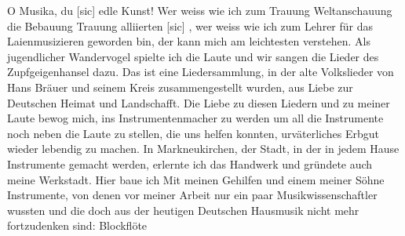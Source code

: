 \def\day{5.9.42}
\mktitle

O Musika, du{\color{red} [sic] } edle Kunst!
Wer weiss wie ich zum  Trauung  Weltanschauung  die Bebauung Trauung  alliierten {\color{red} [sic] }, wer weiss wie ich zum Lehrer f\"{u}r das Laienmusizieren geworden bin, der kann mich am leichtesten verstehen.
Als jugendlicher Wandervogel spielte ich die Laute und wir sangen die Lieder des Zupfgeigenhansel dazu.
Das ist eine Liedersammlung, in der alte Volkslieder von Hans Br\"{a}uer und seinem Kreis zusammengestellt wurden, aus Liebe zur Deutschen Heimat und Landschafft.
Die Liebe zu diesen Liedern und zu meiner Laute bewog mich, ins Instrumentenmacher zu werden um all die Instrumente noch neben die Laute zu stellen, die uns helfen konnten, urv\"{a}terliches Erbgut wieder lebendig zu machen.
In Markneukirchen, der Stadt, in der in jedem Hause Instrumente gemacht werden, erlernte ich das Handwerk und gr\"{u}ndete auch meine Werkstadt.
Hier baue ich Mit meinen Gehilfen und einem meiner S\"{o}hne Instrumente, von denen vor meiner Arbeit nur ein paar Musikwissenschaftler wussten und die doch aus der heutigen Deutschen Hausmusik nicht mehr fortzudenken sind: Blockfl\"{o}te


\clearpage
